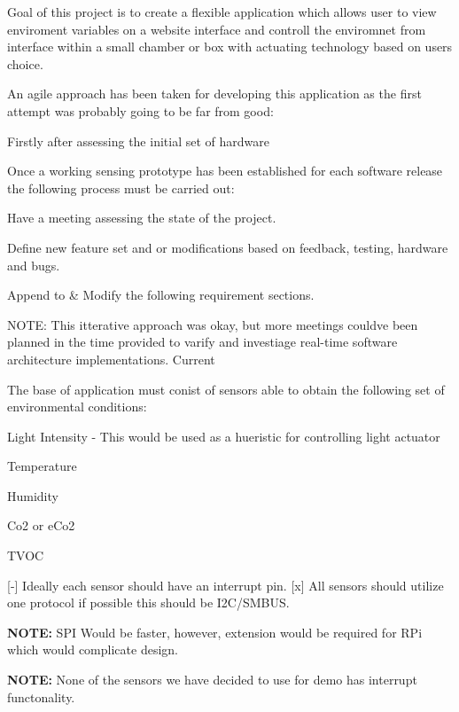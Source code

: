 Goal of this project is to create a flexible application which allows user to view enviroment variables on a website interface and controll the enviromnet from interface within a small chamber or box with actuating technology based on user\textquotesingle{}s choice.

An agile approach has been taken for developing this application as the first attempt was probably going to be far from good\+:

Firstly after assessing the initial set of hardware

Once a working sensing prototype has been established for each software release the following process must be carried out\+:
\begin{DoxyEnumerate}
\item Have a meeting assessing the state of the project.
\item Define new feature set and or modifications based on feedback, testing, hardware and bugs.
\item Append to \& Modify the following requirement sections.
\end{DoxyEnumerate}

N\+O\+TE\+: This itterative approach was okay, but more meetings could\textquotesingle{}ve been planned in the time provided to varify and investiage real-\/time software architecture implementations. Current

The base of application must conist of sensors able to obtain the following set of environmental conditions\+:
\begin{DoxyItemize}
\item Light Intensity -\/ This would be used as a hueristic for controlling light actuator
\item Temperature
\item Humidity
\item Co2 or e\+Co2
\item T\+V\+OC
\end{DoxyItemize}

\mbox{[}-\/\mbox{]} Ideally each sensor should have an interrupt pin. \mbox{[}x\mbox{]} All sensors should utilize one protocol if possible this should be I2\+C/\+S\+M\+B\+US.

{\bfseries N\+O\+TE\+:} S\+PI Would be faster, however, extension would be required for R\+Pi which would complicate design.

{\bfseries N\+O\+TE\+:} None of the sensors we have decided to use for demo has interrupt functonality.

